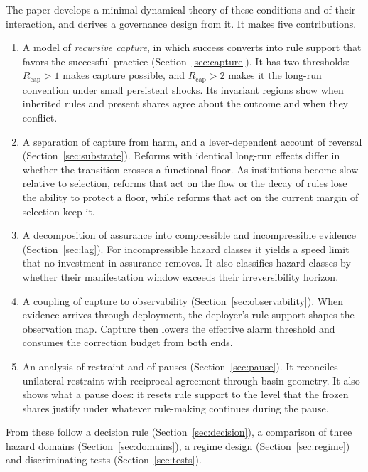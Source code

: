 \documentclass[11pt]{article}
\theoremstyle{plain}
\theoremstyle{definition}
\newcommand{\Rcap}{R_{\mathrm{cap}}}
\begin{document}
The paper develops a minimal dynamical theory of these conditions and of their interaction, and derives a governance design from it. It makes five contributions.
\begin{enumerate}[leftmargin=*]
\item A model of \emph{recursive capture}, in which success converts into rule support that favors the successful practice (Section~\ref{sec:capture}). It has two thresholds: $\Rcap>1$ makes capture possible, and $\Rcap>2$ makes it the long-run convention under small persistent shocks. Its invariant regions show when inherited rules and present shares agree about the outcome and when they conflict.
\item A separation of capture from harm, and a lever-dependent account of reversal (Section~\ref{sec:substrate}). Reforms with identical long-run effects differ in whether the transition crosses a functional floor. As institutions become slow relative to selection, reforms that act on the flow or the decay of rules lose the ability to protect a floor, while reforms that act on the current margin of selection keep it.
\item A decomposition of assurance into compressible and incompressible evidence (Section~\ref{sec:lag}). For incompressible hazard classes it yields a speed limit that no investment in assurance removes. It also classifies hazard classes by whether their manifestation window exceeds their irreversibility horizon.
\item A coupling of capture to observability (Section~\ref{sec:observability}). When evidence arrives through deployment, the deployer's rule support shapes the observation map. Capture then lowers the effective alarm threshold and consumes the correction budget from both ends.
\item An analysis of restraint and of pauses (Section~\ref{sec:pause}). It reconciles unilateral restraint with reciprocal agreement through basin geometry. It also shows what a pause does: it resets rule support to the level that the frozen shares justify under whatever rule-making continues during the pause.
\end{enumerate}
From these follow a decision rule (Section~\ref{sec:decision}), a comparison of three hazard domains (Section~\ref{sec:domains}), a regime design (Section~\ref{sec:regime}) and discriminating tests (Section~\ref{sec:tests}).
\end{document}
